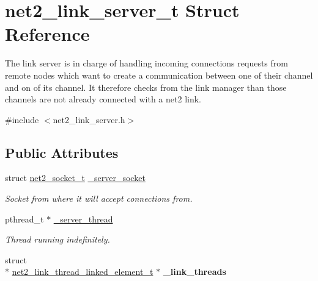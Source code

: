 \hypertarget{structnet2__link__server__t}{\section{net2\-\_\-link\-\_\-server\-\_\-t Struct Reference}
\label{structnet2__link__server__t}
}


The link server is in charge of handling incoming connections requests from remote nodes which want to create a communication between one of their channel and on of its channel. It therefore checks from the link manager than those channels are not already connected with a net2 link.  




{\ttfamily \#include $<$net2\-\_\-link\-\_\-server.\-h$>$}

\subsection*{Public Attributes}
\begin{DoxyCompactItemize}
\item 
\hypertarget{structnet2__link__server__t_abcd4b2d9f1f25fc68d4100d1d897f11f}{struct \hyperlink{structnet2__socket__t}{net2\-\_\-socket\-\_\-t} \hyperlink{structnet2__link__server__t_abcd4b2d9f1f25fc68d4100d1d897f11f}{\-\_\-server\-\_\-socket}}\label{structnet2__link__server__t_abcd4b2d9f1f25fc68d4100d1d897f11f}

\begin{DoxyCompactList}\small\item\em Socket from where it will accept connections from. \end{DoxyCompactList}\item 
\hypertarget{structnet2__link__server__t_ade7ce485e3476cd2f003fd83c9226916}{pthread\-\_\-t $\ast$ \hyperlink{structnet2__link__server__t_ade7ce485e3476cd2f003fd83c9226916}{\-\_\-server\-\_\-thread}}\label{structnet2__link__server__t_ade7ce485e3476cd2f003fd83c9226916}

\begin{DoxyCompactList}\small\item\em Thread running indefinitely. \end{DoxyCompactList}\item 
\hypertarget{structnet2__link__server__t_aa827be9ec74ed0149e6ea70589f711bd}{struct \\*
\hyperlink{structnet2__link__thread__linked__element__t}{net2\-\_\-link\-\_\-thread\-\_\-linked\-\_\-element\-\_\-t} $\ast$ {\bfseries \-\_\-link\-\_\-threads}}\label{structnet2__link__server__t_aa827be9ec74ed0149e6ea70589f711bd}

\end{DoxyCompactItemize}


